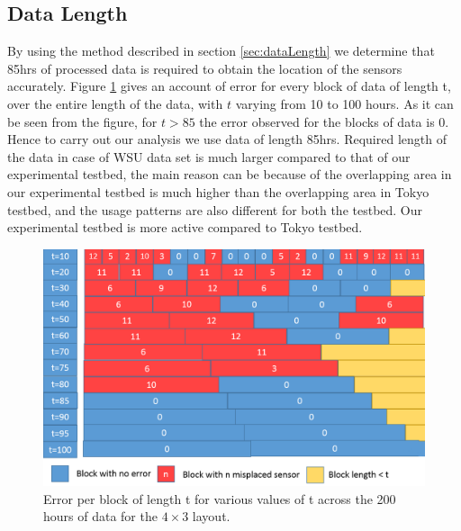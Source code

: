 \subsection{Data Length}
By using the method described in section \ref{sec:dataLength} we determine that 85hrs of processed data is required to obtain the location of the sensors accurately.  Figure \ref{fig:evst} gives an account of error for every block of data of length t, over the entire length of the data, with $t$ varying from 10 to 100 hours.
As it can be seen from the figure, for $t>85$ the error observed for the blocks of data is 0. Hence to carry out our analysis we use data of length 85hrs. Required length of the data in case of WSU data set is much larger compared to that of our experimental testbed, the main reason can be because of the overlapping area in our experimental testbed is much higher than the overlapping area in Tokyo testbed, and the usage patterns are also different for both the testbed. Our experimental testbed is more active compared to Tokyo testbed.
\begin{figure}[!ht]
\includegraphics[scale=0.25]{./pics/errorvstime.png}
\caption{Error per block of length t for various values of t across the 200 hours of data for the $4 \times 3$ layout.}
\label{fig:evst}
\centering
\end{figure}

